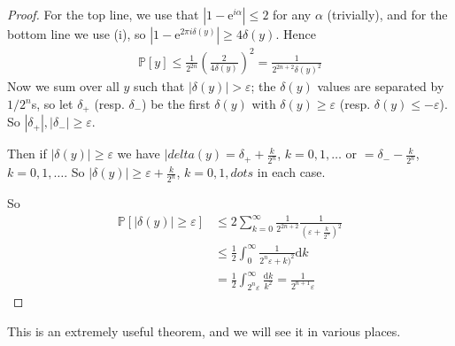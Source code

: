 \documentclass[]{article}
\theoremstyle{custhm}
\theoremstyle{cusdef}
\theoremstyle{custhm}
\theoremstyle{custhm}
\theoremstyle{custhm}
\theoremstyle{custhm}
\theoremstyle{cusdef}
\theoremstyle{remark}
\newcommand{\e}{\mathrm{e}}
\newcommand{\eps}{\varepsilon}
\renewcommand{\P}{\mathbb{P}}
\begin{document}
\begin{proof}
	For the top line, we use that $|1 - \e^{i\alpha}| \le 2$ for any $\alpha$ (trivially), and for the bottom line we use (i), so $|1 - \e^{2\pi i\delta(y)}| \ge 4\delta(y)$. Hence
	\begin{align*}
		\P[y] \le \frac{1}{2^{2n}}\left(\frac{2}{4\delta(y)}\right)^2 = \frac{1}{2^{2n+2}\delta(y)^2}
	\end{align*}
	Now we sum over all $y$ such that $|\delta(y)| > \eps$; the $\delta(y)$ values are separated by $1/2^n$s, so let $\delta_+$ (resp. $\delta_-$) be the first $\delta(y)$ with $\delta(y)\ge \eps$ (resp. $\delta(y)\le -\eps$). So $|\delta_+|,|\delta_-|\ge \eps$.

	Then if $|\delta(y)| \ge \eps$ we have $|delta(y) = \delta_+ + \frac{k}{2^n}$, $k = 0,1,\dots$ or $=\delta_- - \frac{k}{2^n}$, $k = 0,1,\dots$. So $|\delta(y)|\ge \eps +\frac{k}{2^n}$, $k = 0,1,dots$ in each case.

	So
	\begin{align*}
		\P[|\delta(y)| \ge \eps] &\le 2\sum_{k=0}^{\infty}\frac{1}{2^{2n+2}}\frac{1}{(\eps+\frac{k}{2^{n}})^2}\\
		&\le \frac{1}{2}\int_{0}^{\infty}\frac{1}{2^n\eps + k)^2}\textrm{d}k\\
		&=\frac{1}{2}\int_{2^n\eps}^{\infty}\frac{\textrm{d}k}{k^2} = \frac{1}{2^{n+1}\eps}
	\end{align*}
\end{proof}

This is an extremely useful theorem, and we will see it in various places.
\end{document}
